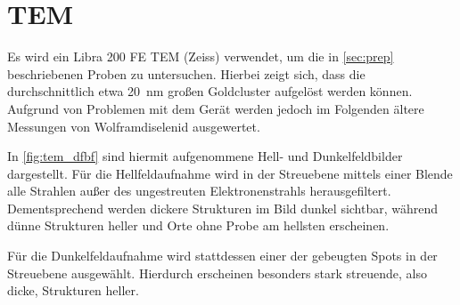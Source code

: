 \newpage
\section{TEM} %

 Es wird ein Libra 200 FE TEM (Zeiss) verwendet, um die in \cref{sec:prep} beschriebenen Proben zu untersuchen.
 Hierbei zeigt sich, dass die durchschnittlich etwa \SI{20}{nm} großen Goldcluster aufgelöst werden können.
 Aufgrund von Problemen mit dem Gerät werden jedoch im Folgenden ältere Messungen von Wolframdiselenid ausgewertet.

 In \cref{fig:tem_dfbf} sind hiermit aufgenommene Hell- und Dunkelfeldbilder dargestellt. %
 Für die Hellfeldaufnahme wird in der Streuebene mittels einer Blende alle Strahlen außer des ungestreuten Elektronenstrahls herausgefiltert.
 Dementsprechend werden dickere Strukturen im Bild dunkel sichtbar, während dünne Strukturen heller und Orte ohne Probe am hellsten erscheinen.

 Für die Dunkelfeldaufnahme wird stattdessen einer der gebeugten Spots in der Streuebene ausgewählt.
 Hierdurch erscheinen besonders stark streuende, also dicke, Strukturen heller.

